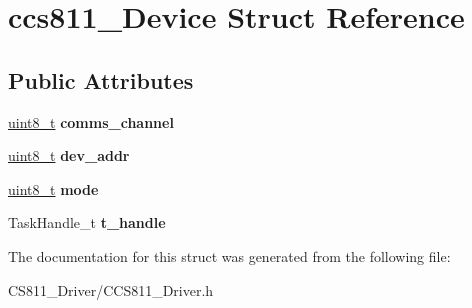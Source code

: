 \hypertarget{structccs811__Device}{}\section{ccs811\+\_\+\+Device Struct Reference}
\label{structccs811__Device}
\subsection*{Public Attributes}
\begin{DoxyCompactItemize}
\item 
\mbox{\label{structccs811__Device_a626bcd68ee6c626a5fb9652c1b6e9633}} 
\hyperlink{vl53l0x__types_8h_aba7bc1797add20fe3efdf37ced1182c5}{uint8\+\_\+t} {\bfseries comms\+\_\+channel}
\item 
\mbox{\label{structccs811__Device_a7b0c53fa4e7ed18d525658f34a08b66f}} 
\hyperlink{vl53l0x__types_8h_aba7bc1797add20fe3efdf37ced1182c5}{uint8\+\_\+t} {\bfseries dev\+\_\+addr}
\item 
\mbox{\label{structccs811__Device_ab865b5d6fc717d8e5d869a5581fe6219}} 
\hyperlink{vl53l0x__types_8h_aba7bc1797add20fe3efdf37ced1182c5}{uint8\+\_\+t} {\bfseries mode}
\item 
\mbox{\label{structccs811__Device_aeebe817bc1087bbd7c6f46ea656782c9}} 
Task\+Handle\+\_\+t {\bfseries t\+\_\+handle}
\end{DoxyCompactItemize}


The documentation for this struct was generated from the following file\+:\begin{DoxyCompactItemize}
\item 
C\+S811\+\_\+\+Driver/C\+C\+S811\+\_\+\+Driver.\+h\end{DoxyCompactItemize}
